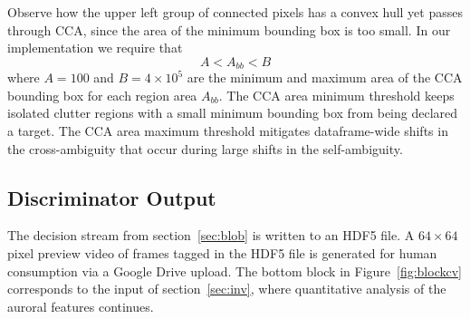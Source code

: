 Observe how the upper left group of connected pixels has a convex hull yet passes through CCA, since the area of the minimum bounding box is too small. 
In our implementation we require that
\begin{equation}
A < A_{bb} < B
\end{equation}
where $A=100$ and $B=4\times 10^5$ are the minimum and maximum area of the CCA bounding box for each region area $A_{bb}$.
The CCA area minimum threshold keeps isolated clutter regions with a small minimum bounding box from being declared a target.
The CCA area maximum threshold mitigates dataframe-wide shifts in the cross-ambiguity that occur during large shifts in the self-ambiguity.

\subsection{Discriminator Output}\label{sec:discout}
The decision stream from section~\ref{sec:blob} is written to an HDF5 file.
A $64 \times 64$ pixel preview video of frames tagged in the HDF5 file is generated for human consumption via a Google Drive upload.
The bottom block in Figure~\ref{fig:blockcv} corresponds to the input of section~\ref{sec:inv}, where quantitative analysis of the auroral features continues.

